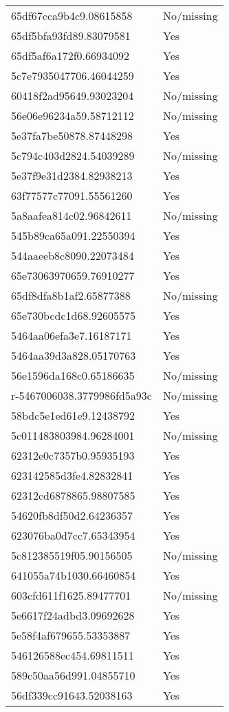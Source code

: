 \begin{tabular}{ll}
65df67cca9b4c9.08615858 & No/missing \\
65df5bfa93fd89.83079581 & Yes \\
65df5af6a172f0.66934092 & Yes \\
5c7e7935047706.46044259 & Yes \\
60418f2ad95649.93023204 & No/missing \\
56e06e96234a59.58712112 & No/missing \\
5e37fa7be50878.87448298 & Yes \\
5c794c403d2824.54039289 & No/missing \\
5e37f9e31d2384.82938213 & Yes \\
63f77577c77091.55561260 & Yes \\
5a8aafea814c02.96842611 & No/missing \\
545b89ca65a091.22550394 & Yes \\
544aaeeb8c8090.22073484 & Yes \\
65e73063970659.76910277 & Yes \\
65df8dfa8b1af2.65877388 & No/missing \\
65e730bcdc1d68.92605575 & Yes \\
5464aa06efa3e7.16187171 & Yes \\
5464aa39d3a828.05170763 & Yes \\
56e1596da168c0.65186635 & No/missing \\
r-5467006038.3779986fd5a93c & No/missing \\
58bdc5e1ed61e9.12438792 & Yes \\
5c011483803984.96284001 & No/missing \\
62312e0c7357b0.95935193 & Yes \\
623142585d3fe4.82832841 & Yes \\
62312cd6878865.98807585 & Yes \\
54620fb8df50d2.64236357 & Yes \\
623076ba0d7cc7.65343954 & Yes \\
5c812385519f05.90156505 & No/missing \\
641055a74b1030.66460854 & Yes \\
603cfd611f1625.89477701 & No/missing \\
5e6617f24adbd3.09692628 & Yes \\
5e58f4af679655.53353887 & Yes \\
546126588ec454.69811511 & Yes \\
589c50aa56d991.04855710 & Yes \\
56df339cc91643.52038163 & Yes \\

\end{tabular}

